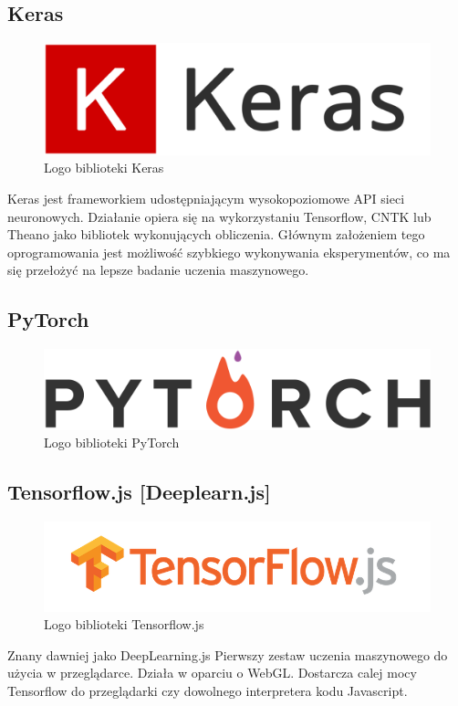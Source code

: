 \documentclass[12pt,a4paper,twoside,titlepage,openright]{book}
\begin{document}
{\subsection{Keras}
\begin{figure}[h]
	\centering
			\includegraphics[resolution=120]{Keras.png}
		\caption{Logo biblioteki Keras}
\end{figure}
Keras jest frameworkiem udostępniającym wysokopoziomowe API sieci neuronowych. Działanie opiera się na wykorzystaniu Tensorflow, CNTK lub Theano jako bibliotek wykonujących obliczenia. Głównym założeniem tego oprogramowania jest możliwość szybkiego wykonywania eksperymentów, co ma się przełożyć na lepsze badanie uczenia maszynowego.

\subsection{PyTorch}
\begin{figure}[h]
	\centering
			\includegraphics[resolution=120]{PyTorch.png}
		\caption{Logo biblioteki PyTorch}
\end{figure}

\subsection{Tensorflow.js [Deeplearn.js]}
\begin{figure}[h]
	\centering
			\includegraphics[resolution=120]{TensorflowJS.png}
		\caption{Logo biblioteki Tensorflow.js}
\end{figure}
Znany dawniej jako DeepLearning.js Pierwszy zestaw uczenia maszynowego do użycia w przeglądarce. Działa w oparciu o WebGL. Dostarcza calej mocy Tensorflow do przeglądarki czy dowolnego interpretera kodu Javascript.

}
\end{document}
